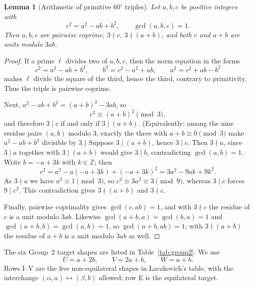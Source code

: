 \documentclass[11pt]{amsart}
\newtheorem{lemma}[theorem]{Lemma}
\theoremstyle{definition}
\theoremstyle{remark}
\newcommand{\Z}{\mathbb Z}
\begin{document}
\begin{lemma}[Arithmetic of primitive $60^\circ$ triples]\label{lem:g60-units}
Let $a,b,c$ be positive integers with
\[
       c^2=a^2-ab+b^2,\qquad\gcd(a,b,c)=1 .
\]
Then $a,b,c$ are pairwise coprime, $3\nmid c$, $3\nmid(a+b)$, and both
$c$ and $a+b$ are units modulo $3ab$.
\end{lemma}

\begin{proof}
If a prime $\ell$ divides two of $a,b,c$, then the norm equation in the
forms
\[
 c^2=a^2-ab+b^2,\qquad b^2=c^2-a^2+ab,\qquad a^2=c^2+ab-b^2
\]
makes $\ell$ divide the square of the third, hence the third, contrary to
primitivity.  Thus the triple is pairwise coprime.

Next, $a^2-ab+b^2=(a+b)^2-3ab$, so
\[
             c^2\equiv(a+b)^2\pmod3,
\]
and therefore $3\mid c$ if and only if $3\mid(a+b)$.  (Equivalently: among the
nine residue pairs $(a,b)$ modulo $3$, exactly the three with
$a+b\equiv0\pmod3$ make $a^2-ab+b^2$ divisible by $3$.)  Suppose
$3\mid(a+b)$, hence $3\mid c$.  Then $3\nmid a$, since $3\mid a$ together with
$3\mid(a+b)$ would give $3\mid b$, contradicting $\gcd(a,b)=1$.  Write
$b=-a+3k$ with $k\in\Z$; then
\[
 c^2=a^2-a(-a+3k)+(-a+3k)^2=3a^2-9ak+9k^2 .
\]
As $3\nmid a$ we have $a^2\equiv1\pmod3$, so $c^2\equiv3a^2\equiv3\pmod9$,
whereas $3\mid c$ forces $9\mid c^2$.  This contradiction gives
$3\nmid(a+b)$ and $3\nmid c$.

Finally, pairwise coprimality gives $\gcd(c,ab)=1$, and with $3\nmid c$ the
residue of $c$ is a unit modulo $3ab$.  Likewise
$\gcd(a+b,a)=\gcd(b,a)=1$ and $\gcd(a+b,b)=\gcd(a,b)=1$, so
$\gcd(a+b,ab)=1$; with $3\nmid(a+b)$ the residue of $a+b$ is a unit modulo
$3ab$ as well.
\end{proof}

The six Group~2 target shapes are listed in Table~\ref{tab:group2}.  We use
\[
             U=a+2b,\qquad V=2a+b,\qquad W=a+b.
\]
Rows I--V are the five non-equilateral shapes in Laczkovich's table, with
the interchange $(\alpha,a)\leftrightarrow(\beta,b)$ allowed; row E is the
equilateral target.
\end{document}
